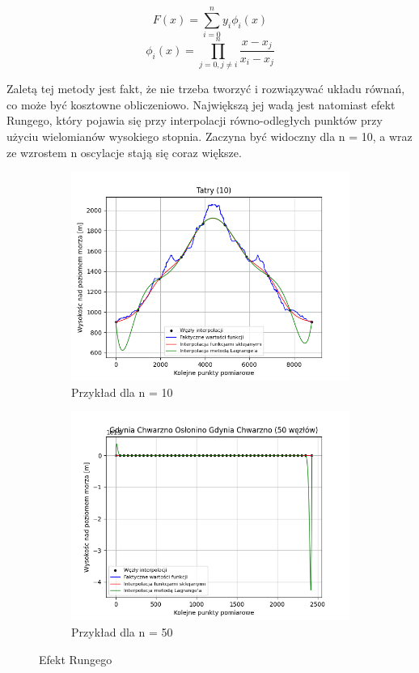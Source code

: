 \documentclass[fleqn]{article}
\begin{document}
    
    \[ 
        F(x) = \sum_{i = 0}^{n} y_i\phi_i(x)   
   \]
   \[
        \phi_i(x) = \prod_{j=0, j \neq i}^n \frac{x - x_j}{x_i - x_j}     
   \]

    \noindent Zaletą tej metody jest fakt, że nie trzeba tworzyć i rozwiązywać układu równań, co może być kosztowne obliczeniowo.
    Największą jej wadą jest natomiast efekt Rungego, który pojawia się przy interpolacji równo-odległych punktów przy użyciu wielomianów
    wysokiego stopnia. Zaczyna być widoczny dla n = 10, a wraz ze wzrostem n oscylacje stają się coraz większe.
    \newpage
    \begin{figure}[h]
        \centering
        \begin{subfigure}{.5\textwidth}
          \centering
          \includegraphics[width=\linewidth]{plot_10_points_Tatry.png}
          \caption{Przykład dla n = 10}
          \label{fig:sub1}
        \end{subfigure}%
        \begin{subfigure}{.5\textwidth}
          \centering
          \includegraphics[width=\linewidth]{efektRungego.png}
          \caption{Przykład dla n = 50}
          \label{fig:sub2}
        \end{subfigure}
        \caption{Efekt Rungego}
        \label{fig:test}
    \end{figure}
\end{document}
